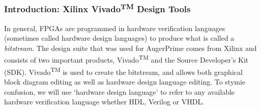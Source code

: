 \subsubsection{Introduction: Xilinx Vivado\textsuperscript{TM} Design Tools}
\label{vivado}

%
In general, FPGAs are programmed in hardware verification languages (sometimes called hardware design languages) to produce what is called a \textit{bitstream}. The design suite that was used for AugerPrime comes from Xilinx and consists of two important products, Vivado\textsuperscript{TM} and the Source Developer's Kit (SDK). Vivado\textsuperscript{TM} is used to create the bitstream, and allows both graphical block diagram editing as well as hardware design language editing. To stymie confusion, we will use `hardware design language' to refer to any available hardware verification language whether HDL, Verilog or VHDL. 

